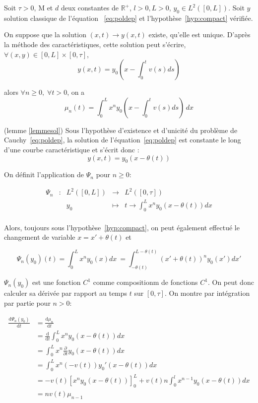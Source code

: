 \documentclass[a4paper]{article}
\newcommand{\mass}{\mathrm{M}}
\newcommand{\dep}{d}
\begin{document}
\begin{lemme}
	\label{lemmesol}
	Soit $\tau>0$, $\mass$ et $\dep$ deux constantes de $\mathbb{R}^+$, 
	$l>0, L>0$, $y_0 \in L^2([0,L])$.
	Soit $y$ solution classique de l'équation ~\eqref{eq:poldep} et l'hypothèse~\eqref{hyp:compact} vérifiée.
	
	On suppose que la solution $(x,t) \to y(x,t)$ existe, qu'elle est unique. 
	D'après la méthode des caractéristiques, cette solution peut s'écrire,
	 $\forall (x,y) \in [0,L] \times [0, \tau]$, 
	\[y(x,t) = y_0(x-\int_{0}^t v(s)ds) \]
	
	alors $\forall n \geq 0, \; \forall t>0$, on a 
	\[\mu_n(t) = \int_0^L x^n y_0(x-\int_{0}^t v(s)ds) \, dx \]
\end{lemme}

\begin{preuve}
	(lemme \ref{lemmesol})
	Sous l'hypothèse d'existence et d'unicité du problème de Cauchy~\eqref{eq:poldep}, la solution de l'équation~\eqref{eq:poldep} est constante le long d'une courbe caractéristique et s'écrit donc :
\[ y(x,t) = y_0(x-\theta(t)) \]
\end{preuve}
  
  
 On définit l'application de $\Psi_n$ pour $n \geq 0$:

   \begin{equation}
  	\begin{array}{ccccc}
  	\Psi_n & : & L^2([0,L]) & \to & L^2([0,\tau]) \\
  	 & & y_0 & \mapsto & t \to \int_0^L x^n y_0(x-\theta(t)) dx\\
  	\end{array}
  \end{equation}
  
  
Alors, toujours sous l'hypothèse~\eqref{hyp:compact}, on peut également effectué le changement de variable $x =x'+\theta(t)$ et
  
\[ \Psi_n (y_0) (t) = \int_0^L x^n y_0(x) dx\ = \int_{-\theta(t)}^{L - \theta(t)} (x'+\theta(t))^ny_0(x')dx'\]
  
$\Psi_n (y_0)$ est une fonction $C^1$ comme compositionm de fonctions $C^1$.
On peut donc calculer sa dérivée par rapport au temps $t$ sur $[0,\tau]$.
On montre par intégration par partie pour $n>0$:
  
\[
\begin{split}
	\frac{\mathrm{d} \Psi_n (y_0) }{\mathrm{d}t} &= \frac{\mathrm{d} \mu_n }{\mathrm{d}t} \\
                                                 &= \frac{\mathrm{d}}{\mathrm{d}t}\int_0^L x^n y_0(x-\theta(t)) dx \\
	                                             &= \int_0^L x^n \frac{\partial}{\partial t}y_0(x-\theta(t)) dx \\
												 &= \int_0^L x^n (-v(t))y_0'(x-\theta(t)) dx \\
												 &= -v(t)[x^n y_0(x-\theta(t))]_0^L + v(t) n \int_0^l x^{n-1} y_0(x-\theta(t)) dx\\
												 &= n v(t) \mu_{n-1}
\end{split}
\]
\end{document}
